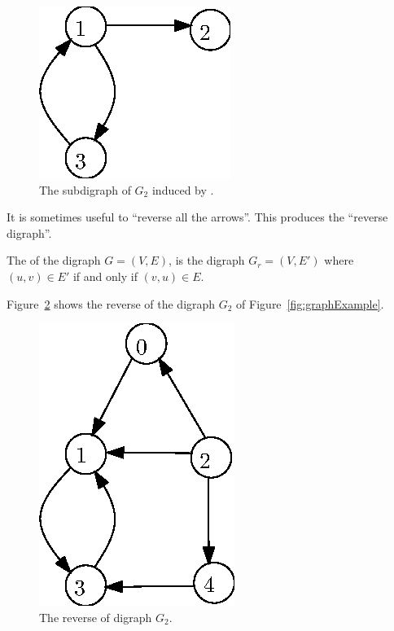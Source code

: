 \begin{figure}[h]
\begin{center}
\includegraphics{figs/wInduced.eps}
\end{center}
\caption{The subdigraph of $G_2$ induced by .}
\label{fig:induced}
\end{figure}

It is sometimes useful to ``reverse all the arrows''. This produces the ``reverse digraph''.

\begin{Definition}
The  of the digraph $G = (V, E)$, is the digraph $G_r = (V, E')$ where $(u, v)\in E'$ if and only if $(v, u)\in E$.
\end{Definition}

\begin{Example}
Figure~\ref{fig:reverse} shows the reverse of the digraph $G_2$ of Figure~\ref{fig:graphExample}.
\end{Example}

\begin{figure}[h]
\begin{center}
\includegraphics{figs/wReverse.eps}
\end{center}
\caption{The reverse of digraph $G_2$.}
\label{fig:reverse}
\end{figure}

